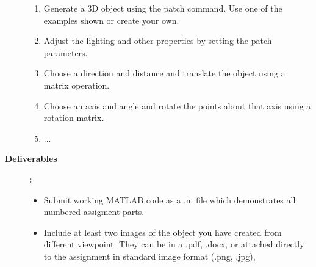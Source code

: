 \documentclass[11pt]{article}
\begin{document}
\begin{description}
  \begin{enumerate}

    \item Generate a 3D object using the patch command. Use one of the examples shown or create your own.

    \item Adjust the lighting and other properties by setting the patch parameters.

    \item Choose a direction and distance and translate the object using a matrix operation.

    \item Choose an axis and angle and rotate the points about that axis using a rotation matrix.

    \item ...

  \end{enumerate}

  \item [\textbf{ \large Deliverables}] \textbf{ \Large :}\\
  \begin{itemize} 
   \item Submit working MATLAB code as a .m file which demonstrates all numbered assigment parts.

   \item Include at least two images of the object you have created from different viewpoint. They can be in a .pdf, .docx, or attached directly to the assignment in standard image format (.png, .jpg),

  \end{itemize}
  \end{description}
 
\end{document}
